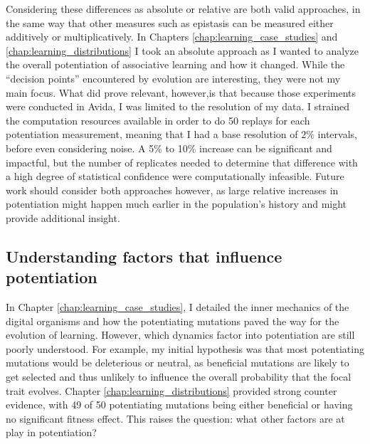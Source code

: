 Considering these differences as absolute or relative are both valid approaches, in the same way that other measures such as epistasis can be measured either additively or multiplicatively. 
In Chapters \ref{chap:learning_case_studies} and \ref{chap:learning_distributions} I took an absolute approach as I wanted to analyze the overall potentiation of associative learning and how it changed. 
While the ``decision points'' encountered by evolution are interesting, they were not my main focus. 
What did prove relevant, however,is that because those experiments were conducted in Avida, I was limited to the resolution of my data.
I strained the computation resources available in order to do 50 replays for each potentiation measurement, meaning that I had a base resolution of $2\%$ intervals, before even considering noise.
A 5\% to 10\% increase can be significant and impactful, but the number of replicates needed to determine that difference with a high degree of statistical confidence were computationally infeasible. 
Future work should consider both approaches however, as large relative increases in potentiation might happen much earlier in the population's history and might provide additional insight. 

\subsection{Understanding factors that influence potentiation}

In Chapter \ref{chap:learning_case_studies}, I detailed the inner mechanics of the digital organisms and how the potentiating mutations paved the way for the evolution of learning. 
However, which dynamics factor into potentiation are still poorly understood. 
For example, my initial hypothesis was that most potentiating mutations would be deleterious or neutral, as beneficial mutations are likely to get selected and thus unlikely to influence the overall probability that the focal trait evolves. 
Chapter \ref{chap:learning_distributions} provided strong counter evidence, with 49 of 50 potentiating mutations being either beneficial or having no significant fitness effect. 
This raises the question: what other factors are at play in potentiation?

